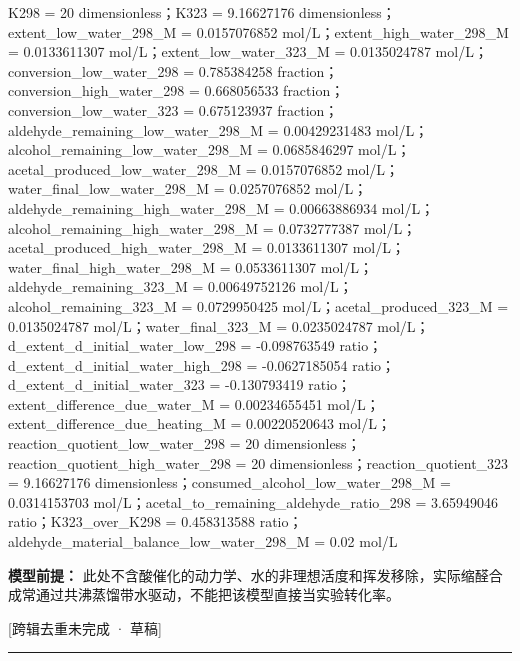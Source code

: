\documentclass[UTF8,11pt,a4paper]{ctexart}
\begin{document}
K298 = 20 dimensionless；K323 = 9.16627176 dimensionless；extent\_low\_water\_298\_M = 0.0157076852 mol/L；extent\_high\_water\_298\_M = 0.0133611307 mol/L；extent\_low\_water\_323\_M = 0.0135024787 mol/L；conversion\_low\_water\_298 = 0.785384258 fraction；conversion\_high\_water\_298 = 0.668056533 fraction；conversion\_low\_water\_323 = 0.675123937 fraction；aldehyde\_remaining\_low\_water\_298\_M = 0.00429231483 mol/L；alcohol\_remaining\_low\_water\_298\_M = 0.0685846297 mol/L；acetal\_produced\_low\_water\_298\_M = 0.0157076852 mol/L；water\_final\_low\_water\_298\_M = 0.0257076852 mol/L；aldehyde\_remaining\_high\_water\_298\_M = 0.00663886934 mol/L；alcohol\_remaining\_high\_water\_298\_M = 0.0732777387 mol/L；acetal\_produced\_high\_water\_298\_M = 0.0133611307 mol/L；water\_final\_high\_water\_298\_M = 0.0533611307 mol/L；aldehyde\_remaining\_323\_M = 0.00649752126 mol/L；alcohol\_remaining\_323\_M = 0.0729950425 mol/L；acetal\_produced\_323\_M = 0.0135024787 mol/L；water\_final\_323\_M = 0.0235024787 mol/L；d\_extent\_d\_initial\_water\_low\_298 = -0.098763549 ratio；d\_extent\_d\_initial\_water\_high\_298 = -0.0627185054 ratio；d\_extent\_d\_initial\_water\_323 = -0.130793419 ratio；extent\_difference\_due\_water\_M = 0.00234655451 mol/L；extent\_difference\_due\_heating\_M = 0.00220520643 mol/L；reaction\_quotient\_low\_water\_298 = 20 dimensionless；reaction\_quotient\_high\_water\_298 = 20 dimensionless；reaction\_quotient\_323 = 9.16627176 dimensionless；consumed\_alcohol\_low\_water\_298\_M = 0.0314153703 mol/L；acetal\_to\_remaining\_aldehyde\_ratio\_298 = 3.65949046 ratio；K323\_over\_K298 = 0.458313588 ratio；aldehyde\_material\_balance\_low\_water\_298\_M = 0.02 mol/L\par
\noindent\textbf{模型前提：}
此处不含酸催化的动力学、水的非理想活度和挥发移除，实际缩醛合成常通过共沸蒸馏带水驱动，不能把该模型直接当实验转化率。\par
\noindent\textcolor{red!65!black}{[跨辑去重未完成 · 草稿]} \par
\medskip\hrule\medskip
{}
\end{document}
